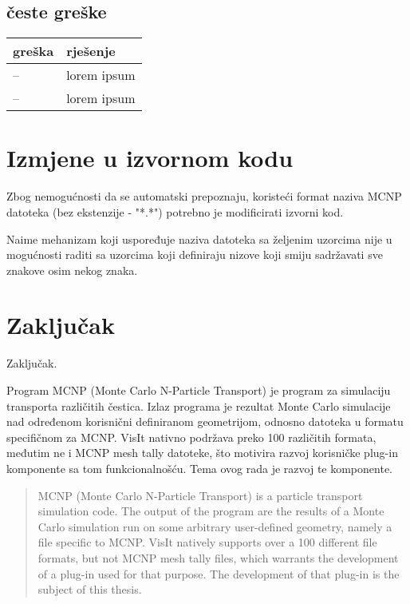 \documentclass[times, utf8, zavrsni]{fer}
\begin{document}
\section{česte greške}
\begin{longtable}{|p{100pt}|p{180pt}|}
	\hline
	greška & rješenje\\
	\hline
	\hline
	-- & lorem ipsum\\
	\hline
	-- & lorem ipsum\\
	\hline
	\endhead %
\end{longtable}

\chapter{Izmjene u izvornom kodu}
Zbog nemogućnosti da se automatski prepoznaju, koristeći format naziva MCNP datoteka (bez ekstenzije - "*.*") potrebno je modificirati izvorni kod.

Naime mehanizam koji uspoređuje naziva datoteka sa željenim uzorcima nije u mogućnosti raditi sa uzorcima koji definiraju nizove koji smiju sadržavati sve znakove osim nekog znaka.



\chapter{Zaključak}
Zaključak.




\begin{sazetak}
Program MCNP (Monte Carlo N-Particle Transport) je program za simulaciju transporta različitih čestica.
Izlaz programa je rezultat Monte Carlo simulacije nad određenom korisnični definiranom geometrijom, odnosno datoteka u formatu specifičnom za MCNP.
VisIt nativno podržava preko 100 različitih formata, međutim ne i MCNP mesh tally datoteke, što motivira razvoj korisničke plug-in komponente sa tom funkcionalnošću.
Tema ovog rada je razvoj te komponente.

\end{sazetak}

\begin{abstract}
MCNP (Monte Carlo N-Particle Transport) is a particle transport simulation code.
The output of the program are the results of a Monte Carlo simulation run on some arbitrary user-defined geometry, namely a file specific to MCNP.
VisIt natively supports over a 100 different file formats, but not MCNP mesh tally files, which warrants the development of a plug-in used for that purpose.
The development of that plug-in is the subject of this thesis. 

\end{abstract}
\end{document}
